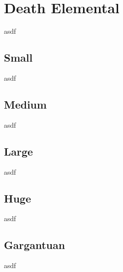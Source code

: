 \section{Death Elemental}

asdf

\subsection{Small}

asdf

\subsection{Medium}

asdf

\subsection{Large}

asdf

\subsection{Huge}

asdf

\subsection{Gargantuan}

asdf